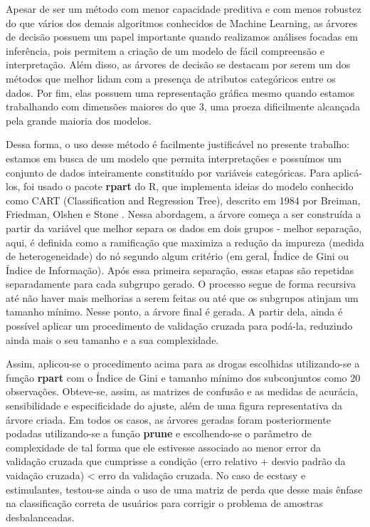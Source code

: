 \documentclass[
	article,			%
	11pt,				%
	oneside,			%
	a4paper,			%
	english,			%
	brazil,				%
	sumario=tradicional
	]{abntex2}
\begin{document}
Apesar de ser um método com menor capacidade preditiva e com menos robustez do que vários dos demais algoritmos conhecidos de Machine Learning, as árvores de decisão possuem um papel importante quando realizamos análises focadas em inferência, pois permitem a criação de um modelo de fácil compreensão e interpretação. Além disso, as árvores de decisão se destacam por serem um dos métodos que melhor lidam com a presença de atributos categóricos entre os dados. Por fim, elas possuem uma representação gráfica mesmo quando estamos trabalhando com dimensões maiores do que 3, uma proeza dificilmente alcançada pela grande maioria dos modelos. 

Dessa forma, o uso desse método é facilmente justificável no presente trabalho: estamos em busca de um modelo que permita interpretações e possuímos um conjunto de dados inteiramente constituído por variáveis categóricas. Para aplicá-los, foi usado o pacote \textbf{rpart} do R, que implementa ideias do modelo conhecido como CART (Classification and Regression Tree), descrito em 1984 por Breiman, Friedman, Olshen e Stone \cite{rpart}. Nessa abordagem, a árvore começa a ser construída a partir da variável que melhor separa os dados em dois grupos - melhor separação, aqui, é definida como a ramificação que maximiza a redução da impureza (medida de heterogeneidade) do nó segundo algum critério (em geral, Índice de Gini ou Índice de Informação). Após essa primeira separação, essas etapas são repetidas separadamente para cada subgrupo gerado. O processo segue de forma recursiva até não haver mais melhorias a serem feitas ou até que os subgrupos atinjam um tamanho mínimo. Nesse ponto, a árvore final é gerada. A partir dela, ainda é possível aplicar um procedimento de validação cruzada para podá-la, reduzindo ainda mais o seu tamanho e a sua complexidade.

Assim, aplicou-se o procedimento acima para as drogas escolhidas utilizando-se a função \textbf{rpart} com o Índice de Gini e tamanho mínimo dos subconjuntos como 20 observações. Obteve-se, assim, as matrizes de confusão e as medidas de acurácia, sensibilidade e especificidade do ajuste, além de uma figura representativa da árvore criada. Em todos os casos, as árvores geradas foram posteriormente podadas utilizando-se a função \textbf{prune} e escolhendo-se o parâmetro de complexidade de tal forma que ele estivesse associado ao menor error da validação cruzada que cumprisse a condição (erro relativo + desvio padrão da vaidação cruzada) < erro da validação cruzada. No caso de ecstasy e estimulantes, testou-se ainda o uso de uma matriz de perda que desse mais ênfase na classificação correta de usuários para corrigir o problema de amostras desbalanceadas.
\end{document}
